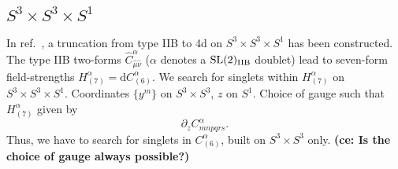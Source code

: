 \documentclass[11pt]{article}
\renewcommand{\d}{\ensuremath{\mathrm{d}}\xspace}
\newcommand{\SL}{\ensuremath{\mathrm{SL}}\xspace}
\newcommand{\ce}[1]{\marginpar{\parbox{\marginparwidth}{\boldmath $\Longleftarrow$}}
{\boldmath\bfseries (ce: #1)}}
\begin{document}
  \subsection{\texorpdfstring{$S^{3}\times S^{3}\times S^{1}$}{S3xS3xS1}}
  In ref.~\cite{Inverso:2016eet}, a truncation from type IIB to 4d on $S^{3}\times S^{3}\times S^{1}$ has been constructed. The type IIB two-forms $\hat{C}^{\alpha}_{\hat{\mu}\hat{\nu}}$ ($\alpha$ denotes a $\SL(2)_{\rm IIB}$ doublet) lead to seven-form field-strengths $H_{(7)}^{\alpha}=\d C_{(6)}^{\alpha}$. We search for singlets within $H_{(7)}^{\alpha}$ on $S^{3}\times S^{3}\times S^{1}$. Coordinates $\{y^{m}\}$ on $S^{3}\times S^{3}$, $z$ on $S^{1}$. Choice of gauge such that $H_{(7)}^{\alpha}$ given by
  \begin{equation}
    \partial_{z}C_{mnpqrs}^{\alpha}.
  \end{equation}
  Thus, we have to search for singlets in $C_{(6)}^{\alpha}$, built on $S^{3}\times S^{3}$ only. \ce{Is the choice of gauge always possible?}
\end{document}

